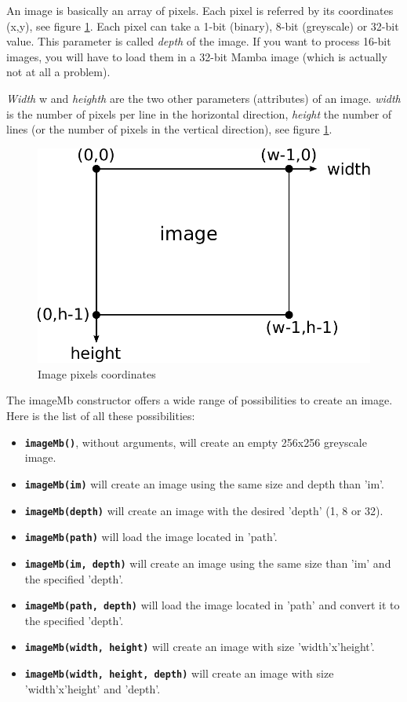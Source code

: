 \documentclass[a4paper,10pt,oneside]{article}
\begin{document}
An image is basically an array of pixels. Each pixel is referred by its coordinates (x,y), see
figure \ref{fig:image_coord}. Each pixel can take a 1-bit (binary), 8-bit (greyscale) or 32-bit value.
This parameter is called \textit{depth} of the image. If you want to process 16-bit images, you will have to
load them in a 32-bit Mamba image (which is actually not at all a problem).

\textit{Width} w and \textit{heighth} are the two other parameters (attributes) of an image. \textit{width} is the number of
pixels per line in the horizontal direction, \textit{height} the number of lines (or the number of pixels in
the vertical direction), see figure \ref{fig:image_coord}.

\begin{figure}
\centering
\includegraphics[scale=0.7]{figures/image_coord.pdf}
\caption{Image pixels coordinates}
\label{fig:image_coord}
\end{figure}

The imageMb constructor offers a wide range of possibilities to create an image. 
Here is the list of all these possibilities:

\begin{itemize}
\item \texttt{\textbf{imageMb()}}, without arguments, will create an empty 
256x256 greyscale image.
\item \texttt{\textbf{imageMb(im)}} will create an image using the same size 
and depth than 'im'.
\item \texttt{\textbf{imageMb(depth)}} will create an image with the desired
'depth' (1, 8 or 32).
\item \texttt{\textbf{imageMb(path)}} will load the image located in 'path'.
\item \texttt{\textbf{imageMb(im, depth)}} will create an image using the same 
size than 'im' and the specified 'depth'.
\item \texttt{\textbf{imageMb(path, depth)}} will load the image located in 
'path' and convert it to the specified 'depth'.
\item \texttt{\textbf{imageMb(width, height)}} will create an image with size 
'width'x'height'.
\item \texttt{\textbf{imageMb(width, height, depth)}} will create an image with
size 'width'x'height' and 'depth'.
\end{itemize}
\end{document}
